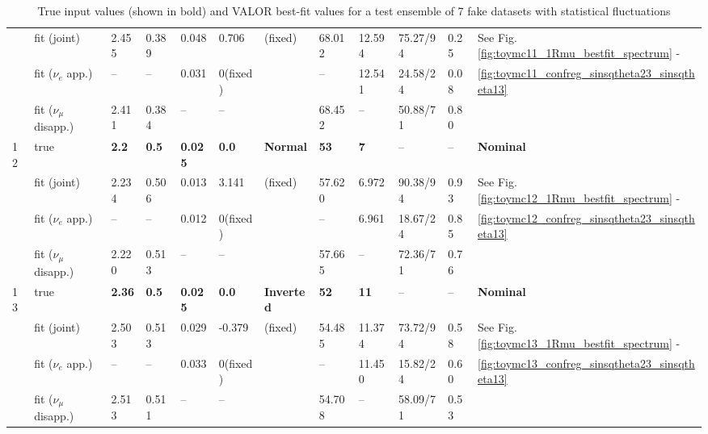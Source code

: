 \begin{table}
\begin{tabular}{@{}|p{0.1cm}p{2.5cm}|p{1.5cm}p{1cm}p{1cm}p{1cm}|p{1cm}|p{1.0cm}p{1.0cm}|p{1.2cm}p{1.2cm}|p{1.5cm}|@{}}
   & fit (joint)               &     2.455      &    0.389   &    0.048   &   0.706 & (fixed)    &    68.012  &     12.594  & 75.27/94        & 0.25 & See Fig. \ref{fig:toymc11_1Rmu_bestfit_spectrum} -  \\
   & fit ($\nu_{e}$ app.)      & --                             & --         &    0.031   & 0(fixed)  &     & --         &   12.541    & 24.58/24      & 0.08 &   \ref{fig:toymc11_confreg_sinsqtheta23_sinsqtheta13}\\
   & fit ($\nu_{\mu}$ disapp.) &   2.411       &     0.384  & --         & --       &    & 68.452       & --          & 50.88/71    & 0.80 &   \\
   \hline
12  & true                      & {\bf 2.2 }   & {\bf 0.5}   & {\bf 0.025}   & {\bf 0.0}  & {\bf Normal} & {\bf 53}   & {\bf 7}    & --          & --   & {\bf Nominal} \\
   & fit (joint)               &     2.234      &    0.506   &    0.013   &   3.141 & (fixed)    &    57.620  &     6.972  & 90.38/94        & 0.93  & See Fig. \ref{fig:toymc12_1Rmu_bestfit_spectrum} -  \\
   & fit ($\nu_{e}$ app.)      & --                             & --         &    0.012   & 0(fixed)  &     & --         &   6.961    & 18.67/24      & 0.85 &   \ref{fig:toymc12_confreg_sinsqtheta23_sinsqtheta13}\\
   & fit ($\nu_{\mu}$ disapp.) &   2.220       &     0.513  & --         & --       &    & 57.665       & --          & 72.36/71    & 0.76 &   \\
     \hline
13  & true                      & {\bf 2.36 }   & {\bf 0.5}   & {\bf 0.025}   & {\bf 0.0}  & {\bf Inverted} & {\bf 52}   & {\bf 11}    & --          & --   & {\bf Nominal} \\
   & fit (joint)               &     2.503      &    0.513   &    0.029   &   -0.379  & (fixed)    &    54.485  &     11.374  & 73.72/94        & 0.58  & See Fig. \ref{fig:toymc13_1Rmu_bestfit_spectrum} -  \\
   & fit ($\nu_{e}$ app.)      & --                             & --         &    0.033   & 0(fixed)  &     & --         &   11.450    & 15.82/24      & 0.60 &   \ref{fig:toymc13_confreg_sinsqtheta23_sinsqtheta13}\\
   & fit ($\nu_{\mu}$ disapp.) &   2.513       &     0.511  & --         & --       &    & 54.708       & --          & 58.09/71    & 0.53 &   \\


\hline
\end{tabular}
\caption{
  True input values (shown in bold) and VALOR best-fit values for a test ensemble of 7 fake datasets with statistical fluctuations
}
\label{tab:toymc_fits:best_fit_values_realistic}
\end{table}


